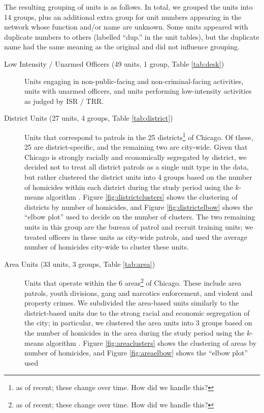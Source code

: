 The resulting grouping of units is as follows. In total, we grouped the units into 
14 groups, plus an additional extra group for unit numbers appearing in the network whose
function and/or name are unknown. Some units appeared with duplicate numbers to others
(labelled ``dup.'' in the unit tables), but the duplicate name had the same meaning as the original
and did not influence grouping. 
\begin{description}
\item[Low Intensity / Unarmed Officers (49 units, 1 group, Table \ref{tab:desk})] Units
engaging in non-public-facing and
non-criminal-facing activities, units with unarmed officers,
and units performing low-intensity activities {\color{red}as judged by ISR / TRR}.
%
\item[District Units (27 units, 4 groups, Table \ref{tab:district})] Units that
correspond to patrols in the 25 districts\footnote{{\color{red} as of recent;
these change over time. How did we handle this?}} of Chicago. Of these, 25 are district-specific, and
the remaining two are city-wide. Given that Chicago is strongly racially and
economically segregated by district, we decided not to treat all district
patrols as a single unit type in the data, but rather clustered the district
units into 4 groups based on the number of homicides within each district
during the study period using the $k$-means algorithm \cite{xx}.  Figure
\ref{fig:districtclusters} shows the clustering of districts by number of
homicides, and Figure \ref{fig:districtelbow} shows the ``elbow plot'' used
to decide on the number of clusters. 
The two remaining units in this group are the bureau of patrol and
recruit training units; we treated officers in these units as city-wide
patrols, and used the average number of homicides city-wide to cluster these
units.
%
\item[Area Units (33 units, 3 groups, Table \ref{tab:area})] Units that operate within
the 6 areas\footnote{{\color{red} as of recent; these change over time. How did we handle this?}}  of
Chicago.  These include area patrols, youth divisions, gang and narcotics enforcement,
and violent and property crimes. We subdivided the area-based units similarly
to the district-based units due to the strong racial and economic segregation
of the city; in particular, we clustered the area units into 3 groups based on
the number of homicides in the area during the study period using the $k$-means
algorithm \cite{xx}. Figure \ref{fig:areaclusters} shows the clustering of
areas by number of homicides, and Figure \ref{fig:areaelbow} shows the ``elbow plot'' used

\end{description}

